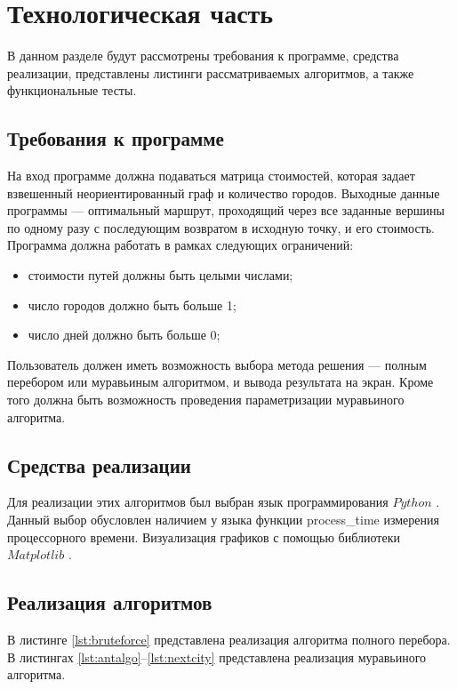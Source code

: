 \chapter{Технологическая часть}

В данном разделе будут рассмотрены требования к программе, средства реализации, представлены листинги рассматриваемых алгоритмов, а также функциональные тесты.

\section{Требования к программе}
На вход программе должна подаваться матрица стоимостей, которая задает взвешенный неориентированный граф и количество городов.
Выходные данные программы --- оптимальный маршрут, проходящий через все заданные вершины по одному разу с последующим возвратом в исходную точку, и его стоимость.
Программа должна работать в рамках следующих ограничений: 

\begin{itemize}
	\item стоимости путей должны быть целыми числами;
	\item число городов должно быть больше 1;
	\item число дней должно быть больше 0;
\end{itemize}

Пользователь должен иметь возможность выбора метода решения --- полным перебором или муравьиным алгоритмом, и вывода результата на экран.
Кроме того должна быть возможность проведения параметризации муравьиного алгоритма.

\section{Средства реализации}
Для реализации этих алгоритмов был выбран язык программирования $Python$ \cite{python}.
Данный выбор обусловлен наличием у языка функции process\_time измерения процессорного времени.
Визуализация графиков с помощью библиотеки $Matplotlib$ \cite{matplot}.

\section{Реализация алгоритмов}

В листинге \ref{lst:bruteforce} представлена реализация алгоритма полного перебора.
В листингах \ref{lst:antalgo}--\ref{lst:nextcity} представлена реализация муравьиного алгоритма.

